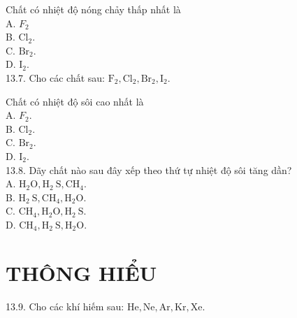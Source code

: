 \documentclass[10pt]{article}
\begin{document}
Chất có nhiệt độ nóng chảy thấp nhất là\\
A. $F_{2}$\\
B. $\mathrm{Cl}_{2}$.\\
C. $\mathrm{Br}_{2}$.\\
D. $\mathrm{I}_{2}$.\\
13.7. Cho các chất sau: $\mathrm{F}_{2}, \mathrm{Cl}_{2}, \mathrm{Br}_{2}, \mathrm{I}_{2}$.

Chất có nhiệt độ sôi cao nhất là\\
A. $F_{2}$.\\
B. $\mathrm{Cl}_{2}$.\\
C. $\mathrm{Br}_{2}$.\\
D. $\mathrm{I}_{2}$.\\
13.8. Dãy chất nào sau đây xếp theo thứ tự nhiệt độ sôi tăng dần?\\
A. $\mathrm{H}_{2} \mathrm{O}, \mathrm{H}_{2} \mathrm{~S}, \mathrm{CH}_{4}$.\\
B. $\mathrm{H}_{2} \mathrm{~S}, \mathrm{CH}_{4}, \mathrm{H}_{2} \mathrm{O}$.\\
C. $\mathrm{CH}_{4}, \mathrm{H}_{2} \mathrm{O}, \mathrm{H}_{2} \mathrm{~S}$.\\
D. $\mathrm{CH}_{4}, \mathrm{H}_{2} \mathrm{~S}, \mathrm{H}_{2} \mathrm{O}$.

\section*{THÔNG HIỂU}
13.9. Cho các khí hiếm sau: $\mathrm{He}, \mathrm{Ne}, \mathrm{Ar}, \mathrm{Kr}, \mathrm{Xe}$.
\end{document}
